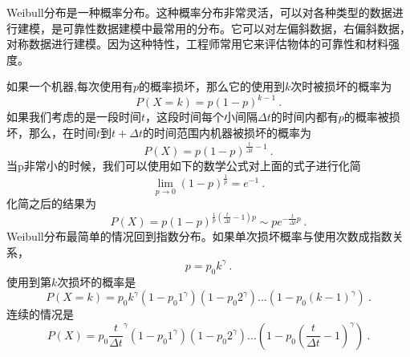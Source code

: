
Weibull分布是一种概率分布。这种概率分布非常灵活，可以对各种类型的数据进行建模，是可靠性数据建模中最常用的分布。它可以对左偏斜数据，右偏斜数据，对称数据进行建模。因为这种特性，工程师常用它来评估物体的可靠性和材料强度。

如果一个机器,每次使用有$p$的概率损坏，那么它的使用到$k$次时被损坏的概率为
\begin{equation}
P(X=k)=p(1-p)^{k-1}~.
\end{equation}
如果我们考虑的是一段时间$t$，这段时间每个小间隔$\Delta t$的时间内都有$p$的概率被损坏，那么，在时间$t$到$t+\Delta t$的时间范围内机器被损坏的概率为
\begin{equation}
P(X)=p(1-p)^{\frac{t}{\Delta t}-1}~.
\end{equation}
当p非常小的时候，我们可以使用如下的数学公式对上面的式子进行化简
\begin{equation}
\lim _{p \rightarrow 0}(1-p)^{\frac{1}{p}}=e^{-1}~.
\end{equation}
化简之后的结果为
\begin{equation}
P(X)=p(1-p)^{\frac{1}{p}\left(\frac{t}{\Delta t}-1\right) p} \sim p e^{-\frac{t}{\Delta t} p}~.
\end{equation}
Weibull分布最简单的情况回到指数分布。如果单次损坏概率与使用次数成指数关系，
\begin{equation}
p=p_0 k^\gamma~.
\end{equation}
使用到第$k$次损坏的概率是
\begin{equation}
P(X=k)=p_0 k^\gamma\left(1-p_0 1^\gamma\right)\left(1-p_0 2^\gamma\right) \ldots\left(1-p_0(k-1)^\gamma\right)~.
\end{equation}
连续的情况是
\begin{equation}
P(X)=p_0 \frac{t}{\Delta t}^\gamma\left(1-p_0 1^\gamma\right)\left(1-p_0 2^\gamma\right) \ldots\left(1-p_0\left(\frac{t}{\Delta t}-1\right)^\gamma\right)~.
\end{equation}